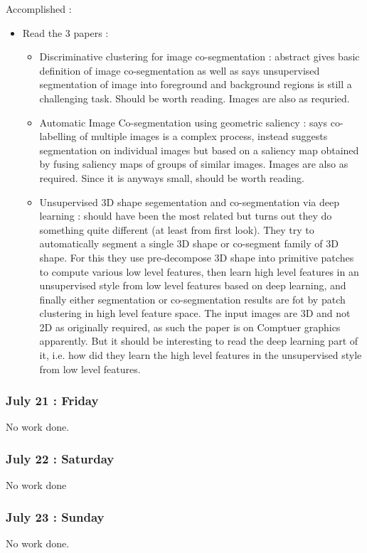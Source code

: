 \documentclass{article}
\begin{document}
Accomplished :
\begin{itemize}
\item Read the 3 papers :
  \begin{itemize}
  \item Discriminative clustering for image co-segmentation \cite{5539868}: abstract gives basic definition of image co-segmentation as well as says unsupervised segmentation of image into foreground and background regions is still a challenging task. Should be worth reading. Images are also as requried.
  \item Automatic Image Co-segmentation using geometric saliency \cite{7025663}: says co-labelling of multiple images is a complex process, instead suggests segmentation on individual images but based on a saliency map obtained by fusing saliency maps of groups of similar images. Images are also as required. Since it is anyways small, should be worth reading.
  \item Unsupervised 3D shape segementation and co-segmentation via deep learning \cite{SHU201639}: should have been the most related but turns out they do something quite different (at least from first look). They try to automatically segment a single 3D shape or co-segment family of 3D shape. For this they use pre-decompose 3D shape into primitive patches to compute various low level features, then learn high level features in an unsupervised style from low level features based on deep learning, and finally either segmentation or co-segmentation results are fot by patch clustering in high level feature space. The input images are 3D and not 2D as originally required, as such the paper is on Comptuer graphics apparently. But it should be interesting to read the deep learning part of it, i.e. how did they learn the high level features in the unsupervised style from low level features.
  \end{itemize}
\end{itemize}

\subsubsection{July 21 : Friday}
No work done.

\subsubsection{July 22 : Saturday}
No work done

\subsubsection{July 23 : Sunday}
No work done.
\end{document}

